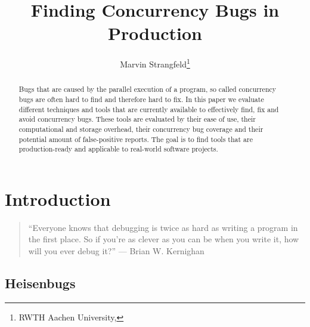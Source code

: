 \documentclass[english]{lni}
\begin{document}
\title{Finding Concurrency Bugs in Production}
\author[Marvin Strangfeld]
{Marvin Strangfeld\footnote{RWTH Aachen University, }}
\maketitle

\begin{abstract}
Bugs that are caused by the parallel execution of a program, so called
concurrency bugs are often hard to find and therefore hard to fix.
In this paper we evaluate different techniques and tools that are currently available to effectively find, fix and avoid concurrency bugs.
These tools are evaluated by their ease of use, their computational and storage overhead, their concurrency bug coverage and their potential amount of false-positive reports.
The goal is to find tools that are production-ready and applicable to real-world software projects.
\end{abstract}
\section{Introduction}

\begin{quote}
``Everyone knows that debugging is twice as hard as writing a program in the first place. So if you're as clever as you can be when you write it, how will you ever debug it?'' --- Brian W. Kernighan\cite{kernighan1974elements}
\end{quote}

\subsection{Heisenbugs}
\end{document}
